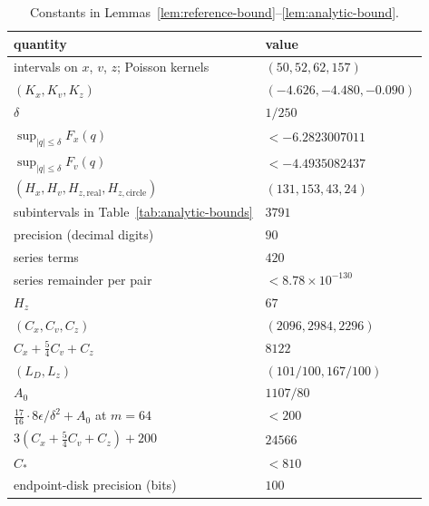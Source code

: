 \documentclass{amsart}
\numberwithin{equation}{section}
\numberwithin{table}{section}
\begin{document}
\begin{table}[ht]
\centering\small
\caption{Constants in Lemmas~\ref{lem:reference-bound}--\ref{lem:analytic-bound}.}
\label{tab:analytic-constants}
\begin{tabular}{ll}
\hline
quantity&value\\
\hline
intervals on $x$, $v$, $z$; Poisson kernels & $(50,52,62,157)$\\
$(K_x,K_v,K_z)$&$(-4.626,-4.480,-0.090)$\\
$\delta$&$1/250$\\
$\sup_{|q|\le\delta}F_x(q)$&$<-6.2823007011$\\
$\sup_{|q|\le\delta}F_v(q)$&$<-4.4935082437$\\
$(H_x,H_v,H_{z,\mathrm{real}},H_{z,\mathrm{circle}})$&$(131,153,43,24)$\\
subintervals in Table~\ref{tab:analytic-bounds}&$3791$\\
precision (decimal digits)&$90$\\
series terms&$420$\\
series remainder per pair&$<8.78\times10^{-130}$\\
\hline
$H_z$&$67$\\
$(C_x,C_v,C_z)$&$(2096,2984,2296)$\\
$C_x+\tfrac54C_v+C_z$&$8122$\\
$(L_D,L_z)$&$(101/100,167/100)$\\
$A_0$&$1107/80$\\
$\tfrac{17}{16}\cdot8\epsilon/\delta^2+A_0$ at $m=64$&$<200$\\
$3(C_x+\tfrac54C_v+C_z)+200$&$24566$\\
$C_*$&$<810$\\
endpoint-disk precision (bits)&$100$\\
\hline
\end{tabular}
\end{table}
\end{document}
